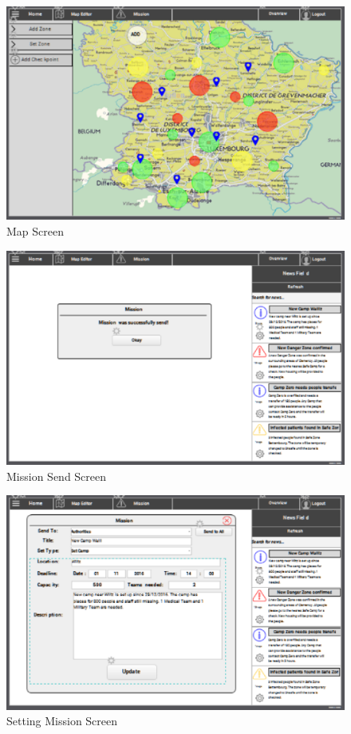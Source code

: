 \begin{figure}[htbp]
\begin{center}
 \caption{\label{fig:W9} Map Screen}
   \includegraphics[width=150mm]{./images/Web/map.eps}
\end{center}
\end{figure}
\begin{figure}[htbp]
\begin{center}
 \caption{\label{fig:W12} Mission Send Screen}
   \includegraphics[width=150mm]{./images/Web/cmissionsendscreen.eps}
\end{center}
\end{figure}
\begin{figure}[htbp]
\begin{center}
 \caption{\label{fig:W13} Setting Mission Screen}
   \includegraphics[width=150mm]{./images/Web/csettingmissionscreen.eps}
\end{center}
\end{figure}
